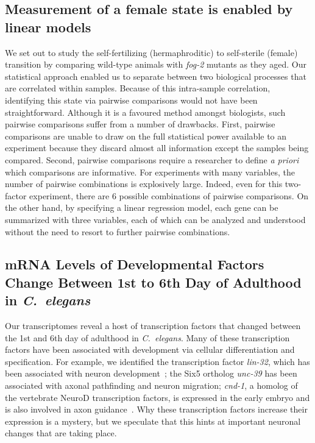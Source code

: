 \documentclass[10pt,letterpaper,twocolumn]{article}
\newcommand{\cel}{\emph{C.~elegans}}
\newcommand{\fog}{\emph{\mbox{fog-2}}}
\begin{document}
\subsection*{Measurement of a female state is enabled by linear models}
\label{sub:female_state}

We set out to study the self-fertilizing (hermaphroditic) to self-sterile
(female) transition by comparing wild-type animals with \fog{} mutants as they
aged. Our statistical approach enabled us to separate between two biological
processes that are correlated within samples. Because of this intra-sample
correlation, identifying this state via pairwise comparisons would not have been
straightforward. Although it is a favoured method amongst biologists, such
pairwise comparisons suffer from a number of drawbacks.
First, pairwise comparisons are unable to draw on the full statistical power
available to an experiment because they discard almost all information except
the samples being compared. Second, pairwise comparisons require a researcher
to define \emph{a priori} which comparisons are informative. For experiments
with many variables, the number of pairwise combinations is explosively large.
Indeed, even for this two-factor experiment, there are 6 possible combinations
of pairwise comparisons. On the other hand, by specifying a linear regression
model, each gene can be summarized with three variables, each of which can be
analyzed and understood without the need to resort to further pairwise
combinations.

\subsection*{mRNA Levels of Developmental Factors Change Between 1st
             to 6th Day of Adulthood in \cel{}}
\label{sub:development_in_aging}

Our transcriptomes reveal a host of transcription factors that changed between
the 1st and 6th day of adulthood in \cel{}. Many of these transcription factors
have been associated with development via cellular differentiation and
specification. For example, we identified the transcription factor
\emph{lin-32}, which has been associated with neuron
development~\cite{Chalfie1989,Zhao1995,Portman2000}; the Six5 ortholog
\emph{unc-39} has been associated with axonal pathfinding and neuron
migration\cite{Manser1990,Yanowitz2004}; \emph{cnd-1}, a homolog  of the
vertebrate NeuroD transcription factors, is expressed in the early embryo and is
also involved in axon guidance~\cite{Schmitz2007}.
Why these transcription factors increase their expression is a mystery,
but we speculate that this hints at important neuronal changes that are
taking place.
\end{document}
